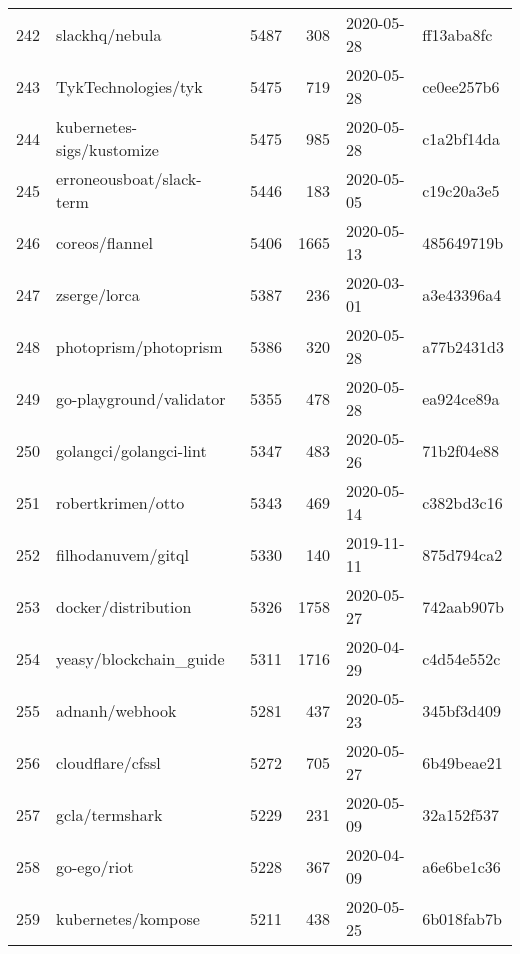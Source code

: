 \begin{longtable}{llrrll}
    242 &                                     slackhq/nebula &   5487 &    308 & 2020-05-28 &  ff13aba8fc \\
    243 &                                TykTechnologies/tyk &   5475 &    719 & 2020-05-28 &  ce0ee257b6 \\
    244 &                          kubernetes-sigs/kustomize &   5475 &    985 & 2020-05-28 &  c1a2bf14da \\
    245 &                           erroneousboat/slack-term &   5446 &    183 & 2020-05-05 &  c19c20a3e5 \\
    246 &                                     coreos/flannel &   5406 &   1665 & 2020-05-13 &  485649719b \\
    247 &                                       zserge/lorca &   5387 &    236 & 2020-03-01 &  a3e43396a4 \\
    248 &                              photoprism/photoprism &   5386 &    320 & 2020-05-28 &  a77b2431d3 \\
    249 &                            go-playground/validator &   5355 &    478 & 2020-05-28 &  ea924ce89a \\
    250 &                             golangci/golangci-lint &   5347 &    483 & 2020-05-26 &  71b2f04e88 \\
    251 &                                  robertkrimen/otto &   5343 &    469 & 2020-05-14 &  c382bd3c16 \\
    252 &                                 filhodanuvem/gitql &   5330 &    140 & 2019-11-11 &  875d794ca2 \\
    253 &                                docker/distribution &   5326 &   1758 & 2020-05-27 &  742aab907b \\
    254 &                             yeasy/blockchain\_guide &   5311 &   1716 & 2020-04-29 &  c4d54e552c \\
    255 &                                     adnanh/webhook &   5281 &    437 & 2020-05-23 &  345bf3d409 \\
    256 &                                   cloudflare/cfssl &   5272 &    705 & 2020-05-27 &  6b49beae21 \\
    257 &                                     gcla/termshark &   5229 &    231 & 2020-05-09 &  32a152f537 \\
    258 &                                        go-ego/riot &   5228 &    367 & 2020-04-09 &  a6e6be1c36 \\
    259 &                                 kubernetes/kompose &   5211 &    438 & 2020-05-25 &  6b018fab7b \\

\end{longtable}

